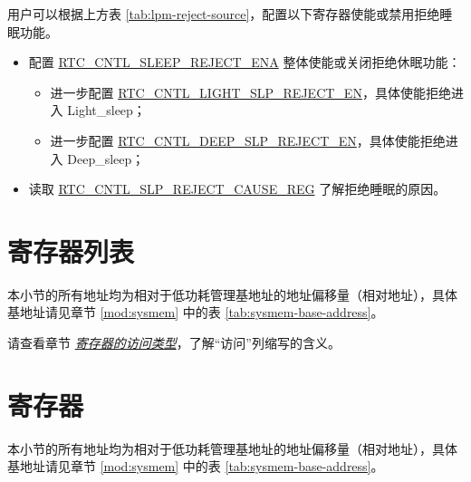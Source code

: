 \documentclass[main\_\_CN.tex]{subfiles}
\begin{document}
用户可以根据上方表 \ref{tab:lpm-reject-source}，配置以下寄存器使能或禁用拒绝睡眠功能。
\begin{itemize}
    \item 配置 \hyperref[fielddesc:RTCCNTLSLEEPREJECTENA]{RTC\_CNTL\_SLEEP\_REJECT\_ENA} 整体使能或关闭拒绝休眠功能：
        \begin{itemize}
            \item 进一步配置 \hyperref[fielddesc:RTCCNTLLIGHTSLPREJECTEN]{RTC\_CNTL\_LIGHT\_SLP\_REJECT\_EN}，具体使能拒绝进入 Light\_sleep；
            \item 进一步配置 \hyperref[fielddesc:RTCCNTLDEEPSLPREJECTEN]{RTC\_CNTL\_DEEP\_SLP\_REJECT\_EN}，具体使能拒绝进入 Deep\_sleep；
        \end{itemize}
    \item 读取 \hyperref[fielddesc:RTCCNTLREJECTCAUSE]{RTC\_CNTL\_SLP\_REJECT\_CAUSE\_REG} 了解拒绝睡眠的原因。
\end{itemize}


\clearpage
\section{寄存器列表}\label{sec:lowpowm-reg-summ}
\hypertarget{lowpowm-reg-summ}{}

本小节的所有地址均为相对于低功耗管理基地址的地址偏移量（相对地址），具体基地址请见章节 \ref{mod:sysmem} \textit{} 中的表 \ref{tab:sysmem-base-address}。

请查看章节 \hyperref[glossary-access-types]{\textit{寄存器的访问类型}}，了解“访问”列缩写的含义。



\clearpage
\section{寄存器}


本小节的所有地址均为相对于低功耗管理基地址的地址偏移量（相对地址），具体基地址请见章节 \ref{mod:sysmem} \textit{} 中的表 \ref{tab:sysmem-base-address}。

\end{document}
